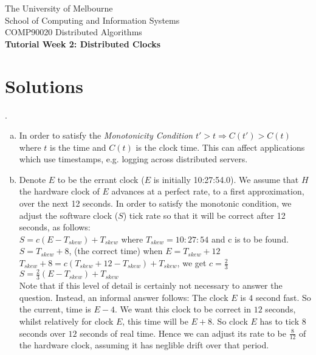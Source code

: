 \documentclass[12pt]{article}
\newcounter{question}
\newcommand{\question}[1]{
    \stepcounter{question}
    \thequestion. #1 \hfill
}
\begin{document}
\begin{center}
    {\sc The University of Melbourne
        \\
        School of Computing and Information Systems
        \\
    COMP90020 Distributed Algorithms}
    \bigskip \\
    {\Large\bf Tutorial Week 2: Distributed Clocks}
\end{center}
\section*{Solutions}

\question{}

\begin{enumerate}[(a)]
    \item In order to satisfy the \textit{Monotonicity Condition} $t' > t \Rightarrow C(t') > C(t)$ where $t$ is the time and $C(t)$ is the clock time. This can affect applications which use timestamps, e.g. logging across distributed servers.
    \item Denote $E$ to be the errant clock ($E$ is initially 10:27:54.0). We assume that $H$ the hardware clock of $E$ advances at a perfect rate, to a first approximation, over the next 12 seconds. In order to satisfy the monotonic condition, we adjust the software clock ($S$) tick rate so that it will be correct after 12 seconds, as follows:\\
        $S  =  c(E-T_{skew})+T_{skew}$ where $T_{skew} = 10:27:54$ and c is to be found.\\
        $S =  T_{skew} + 8$, (the correct time) when $E= T_{skew} + 12$ \\
        $T_{skew} + 8  =  c(T_{skew} + 12 - T_{skew}) + T_{skew}$, we get $c = \frac{2}{3}$ \\
        $S = \frac{2}{3}(E -  T_{skew}) + T_{skew}$\\

        Note that if this level of detail is certainly not necessary to answer the question. Instead, an informal answer follows: The clock $E$ is $4$ second fast. So the current, time is $E - 4$. We want this clock to be correct in $12$ seconds, whilst relatively for clock $E$, this time will be $E+8$. So clock $E$ has to tick $8$ seconds over $12$ seconds of real time. Hence we can adjust its rate to be $\frac{8}{12}$ of the hardware clock, assuming it has neglible drift over that period.
\end{enumerate}
\end{document}

